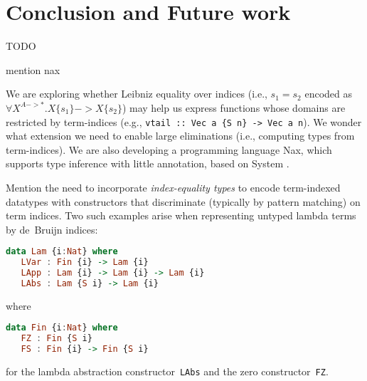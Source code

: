 \section{Conclusion and Future work}
\label{sec:concl}
TODO

mention nax

We are exploring whether Leibniz equality over indices
(i.e., $s_1=s_2$ encoded as $\forall X^{A -> *}.X\{s_1\} -> X\{s_2\}$)
may help us express functions whose domains are restricted by term-indices
(e.g., \verb|vtail :: Vec a {S n} -> Vec a n|). We wonder what extension
we need to enable large eliminations (i.e., computing types from term-indices).
We are also developing a programming language Nax, which supports
type inference with little annotation, based on System \Fi.

Mention the need to incorporate \emph{index-equality types} to encode
term-indexed datatypes with constructors that discriminate (typically by
pattern matching) on term indices.  Two such examples arise when
representing untyped lambda terms by de~Bruijn indices: 
\begin{lstlisting}[basicstyle={\ttfamily},language=Haskell]
 data Lam {i:Nat} where
   LVar : Fin {i} -> Lam {i}
   LApp : Lam {i} -> Lam {i} -> Lam {i}
   LAbs : Lam {S i} -> Lam {i}
\end{lstlisting}
where 
\begin{lstlisting}[basicstyle={\ttfamily},language=Haskell]
 data Fin {i:Nat} where
   FZ : Fin {S i} 
   FS : Fin {i} -> Fin {S i} 
\end{lstlisting}
for the lambda abstraction constructor~{\tt LAbs} and the zero
constructor~{\tt FZ}.

